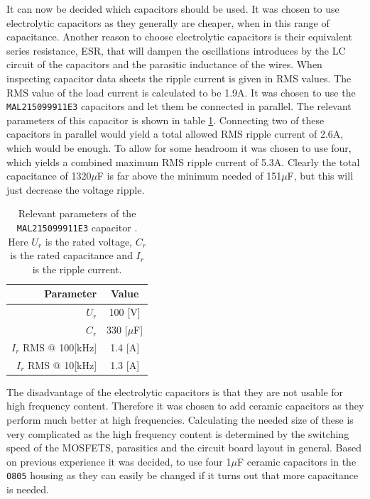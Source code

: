 It can now be decided which capacitors should be used.
It was chosen to use electrolytic capacitors as they generally are cheaper, when in this range of capacitance. 
Another reason to choose electrolytic capacitors is their equivalent series resistance, ESR, that will dampen the oscillations introduces by the LC circuit of the capacitors and the parasitic inductance of the wires.
When inspecting capacitor data sheets the ripple current is given in RMS values. 
The RMS value of the load current is calculated to be 1.9A.
It was chosen to use the \texttt{MAL215099911E3} capacitors and let them be connected in parallel. 
The relevant parameters of this capacitor is shown in table \ref{tab:cap_parameters}.
Connecting two of these capacitors in parallel would yield a total allowed RMS ripple current of 2.6A, which would be enough.
To allow for some headroom it was chosen to use four, which yields a combined maximum RMS ripple current of 5.3A. 
Clearly the total capacitance of 1320$\mu$F is far above the minimum needed of 151$\mu$F, but this will just decrease the voltage ripple.

\begin{table}[tb]
	\centering
	\begin{tabular}{|r|c|}
	\hline
		\textbf{Parameter} & \textbf{Value} \\
	\hline
		$U_r$ & 100 [V]  \\ \hline
		$C_r$ & 330 [$\mu$F]  \\ \hline
		$I_r$ RMS @ 100[kHz] & 1.4 [A]  \\ \hline
		$I_r$ RMS @ 10[kHz] & 1.3 [A]  \\ \hline
		
	\end{tabular}
	\caption{Relevant parameters of the \texttt{MAL215099911E3} capacitor \cite{sup_cap}.
	Here $U_r$ is the rated voltage, $C_r$ is the rated capacitance and $I_r$ is the ripple current.}
	\label{tab:cap_parameters}
\end{table}

The disadvantage of the electrolytic capacitors is that they are not usable for high frequency content.
Therefore it was chosen to add ceramic capacitors as they perform much better at high frequencies. 
Calculating the needed size of these is very complicated as the high frequency content is determined by the switching speed of the MOSFETS, parasitics and the circuit board layout in general. 
Based on previous experience it was decided, to use four 1$\mu$F ceramic capacitors in the \texttt{0805} housing as they can easily be changed if it turns out that more capacitance is needed.

